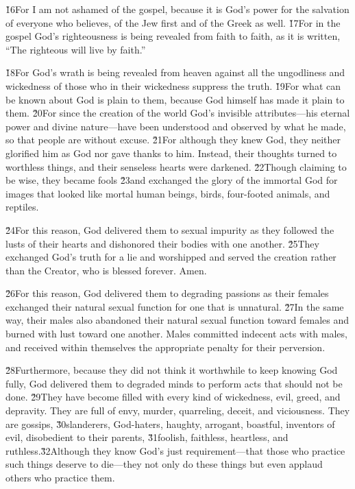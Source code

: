 \v{16}For I am not ashamed of the gospel, because it is God's power for the salvation of everyone who believes, of the Jew first and of the Greek as well. \v{17}For in the gospel God's righteousness is being revealed from faith to faith, as it is written, ``The righteous will live by faith.''

\v{18}For God's wrath is being revealed from heaven against all the ungodliness and wickedness of those who in their wickedness suppress the truth. \v{19}For what can be known about God is plain to them, because God himself has made it plain to them. \v{20}For since the creation of the world God's invisible attributes---his eternal power and divine nature---have been understood and observed by what he made, so that people are without excuse. \v{21}For although they knew God, they neither glorified him as God nor gave thanks to him. Instead, their thoughts turned to worthless things, and their senseless hearts were darkened. \v{22}Though claiming to be wise, they became fools \v{23}and exchanged the glory of the immortal God for images that looked like mortal human beings, birds, four-footed animals, and reptiles.

\v{24}For this reason, God delivered them to sexual impurity as they followed the lusts of their hearts and dishonored their bodies with one another. \v{25}They exchanged God's truth for a lie and worshipped and served the creation rather than the Creator, who is blessed forever. Amen.

\v{26}For this reason, God delivered them to degrading passions as their females exchanged their natural sexual function for one that is unnatural. \v{27}In the same way, their males also abandoned their natural sexual function toward females and burned with lust toward one another. Males committed indecent acts with males, and received within themselves the appropriate penalty for their perversion.

\v{28}Furthermore, because they did not think it worthwhile to keep knowing God fully, God delivered them to degraded minds to perform acts that should not be done. \v{29}They have become filled with every kind of wickedness, evil, greed, and depravity. They are full of envy, murder, quarreling, deceit, and viciousness. They are gossips, \v{30}slanderers, God-haters, haughty, arrogant, boastful, inventors of evil, disobedient to their parents, \v{31}foolish, faithless, heartless, and ruthless.\v{32}Although they know God's just requirement---that those who practice such things deserve to die---they not only do these things but even applaud others who practice them.

